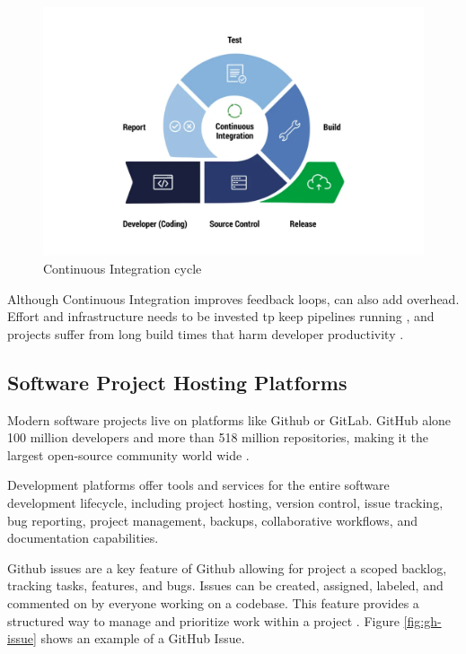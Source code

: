 \begin{figure}[H]
    \centering
    \includegraphics[width=1\textwidth]{images/ci-cycle.png}
    \caption{Continuous Integration cycle}
    \label{fig:ci-cycle}
\end{figure}

Although Continuous Integration improves feedback loops, can also add overhead. Effort and infrastructure needs to be invested tp keep pipelines running \cite{hiltonUsageCostsBenefits2016}, and projects suffer from long build times that harm developer productivity \cite{ghalebEmpiricalStudyLong2019}.

\subsection{Software Project Hosting Platforms} \label{subsection:Software Project Hosting Platforms}

Modern software projects live on platforms like Github or GitLab. GitHub alone   100 million developers and more than 518 million repositories, making it the largest open-source community world wide \cite{staffOctoverseAILeads2024}.

Development platforms offer tools and services for the entire software development lifecycle, including project hosting, version control, issue tracking, bug reporting, project management, backups, collaborative workflows, and documentation capabilities. \cite{GitHubFeatures2025, abrahamssonAgileSoftwareDevelopment2017}

Github issues are a key feature of Github allowing for project a scoped backlog, tracking tasks, features, and bugs. Issues can be created, assigned, labeled, and commented on by everyone working on a codebase. This feature provides a structured way to manage and prioritize work within a project \cite{Issues}. Figure \ref{fig:gh-issue} shows an example of a GitHub Issue.

